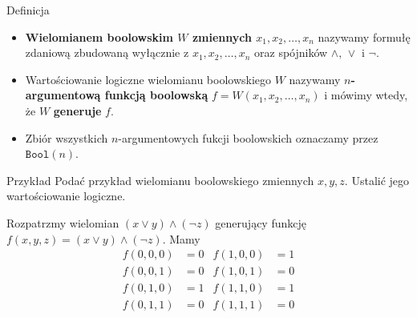 \documentclass[a4paper,10pt]{beamer}
\begin{document}
\begin{frame}
	
	\begin{block}{Definicja}
		\begin{itemize}
		\item {\bf Wielomianem boolowskim $W$ zmiennych $x_1,x_2,\ldots,x_n$} nazywamy formułę zdaniową zbudowaną wyłącznie z $x_1,x_2,\ldots,x_n$ oraz spójników $\wedge,\,\vee$ i $\neg$.
		
		\item Wartościowanie logiczne wielomianu boolowskiego $W$ nazywamy {\bf $n$-argumentową funkcją boolowską} $f=W(x_1,x_2,\ldots,x_n)$ i mówimy wtedy, że $W$ {\bf generuje} $f$.
		
		\item Zbiór wszystkich $n$-argumentowych fukcji boolowskich oznaczamy przez $\mathtt{Bool}(n)$.
		\end{itemize}
	\end{block}

	\begin{exampleblock}{Przykład}
		Podać przykład wielomianu boolowskiego zmiennych $x,y,z$. Ustalić jego wartościowanie logiczne.
		
		Rozpatrzmy wielomian $(x\vee y)\wedge(\neg z)$ generujący funkcję $f(x,y,z)=(x\vee y)\wedge(\neg z)$. Mamy
		\begin{align*}
			f(0,0,0)&=0&f(1,0,0)&=1\\
			f(0,0,1)&=0&f(1,0,1)&=0\\
			f(0,1,0)&=1&f(1,1,0)&=1\\
			f(0,1,1)&=0&f(1,1,1)&=0
		\end{align*}
	\end{exampleblock}
	
\end{frame}
\end{document}
